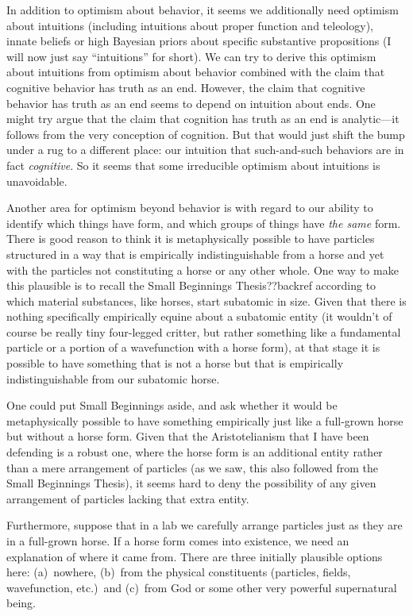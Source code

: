 In addition to optimism about behavior, it seems we additionally need optimism about intuitions (including
intuitions about proper function and teleology), innate beliefs or 
high Bayesian priors about specific substantive propositions (I will now just say ``intuitions'' for short). We can try to derive 
this optimism about intuitions from optimism about behavior combined with the claim that cognitive behavior has truth as 
an end. However, the claim that cognitive behavior has truth as an end seems to depend on intuition about ends. One might 
try argue that the claim that cognition has truth as an end is analytic---it follows from the very conception of cognition.
But that would just shift the bump under a rug to a different place: our intuition that such-and-such behaviors are in fact
\textit{cognitive}. So it seems that some irreducible optimism about intuitions is unavoidable. 

Another area for optimism beyond behavior is with regard to our ability to identify which things have form, and which groups of
things have \textit{the same} form. There is good reason to think it is metaphysically possible to have particles structured in 
a way that is empirically indistinguishable from a horse and yet with the particles not constituting a horse or any other 
whole. One way to make this plausible is to recall the Small Beginnings Thesis??backref according to which material substances, 
like horses, start subatomic in size. Given that there is nothing specifically empirically equine about a subatomic entity
(it wouldn't of course be really tiny four-legged critter, but rather something like a fundamental particle or a portion of a 
wavefunction with a horse form), at that stage it is possible to have something that is not a horse but 
that is empirically indistinguishable from our subatomic horse. 

One could put Small Beginnings aside, and ask whether it would be metaphysically possible to have something empirically
just like a full-grown horse but without a horse form. Given that the Aristotelianism that I have been defending is a 
robust one, where the horse form is an additional entity rather than a mere arrangement of particles (as we saw, this also
followed from the Small Beginnings Thesis), it seems hard to deny the possibility of any given arrangement of particles lacking that
extra entity. 

Furthermore, suppose that in a lab we 
carefully arrange particles just as they are in a full-grown horse. If a horse form comes into existence, we need an explanation 
of where it came from. There are three initially plausible options here: (a)~nowhere, (b)~from the physical constituents (particles,
fields, wavefunction, etc.)\ and (c)~from God or some other very powerful supernatural being.

